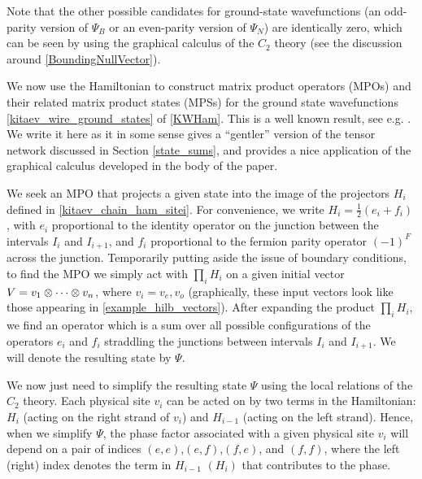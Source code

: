 Note that the other possible candidates for ground-state wavefunctions (an odd-parity version of $\Psi_B$ or an even-parity version of $\Psi_N$) are identically zero, which can be seen by using the graphical 
calculus of the $C_2$ theory (see the discussion around \eqref{BoundingNullVector}).

We now use the Hamiltonian to construct matrix product operators (MPOs) and their related matrix product states (MPSs) for the ground state wavefunctions \eqref{kitaev_wire_ground_states} of \eqref{KWHam}.
This is a well known result, see e.g. \cite{fidkowski2011,turzillo2016,bultinck2017b}.
We write it here as it in some sense gives a ``gentler'' version of the tensor network discussed in Section \ref{state_sums}, and provides a nice application of the graphical calculus developed in the body of the paper.

We seek an MPO that projects a given state into the image of the projectors $H_i$ defined in \eqref{kitaev_chain_ham_sitei}. 
For convenience, we write $H_i =\frac{1}{2}( e_{i} + f_{i})$, with $e_{i}$ proportional to the identity operator on the junction between the intervals $I_i$ and $I_{i+1}$, and $f_{i}$ proportional to the fermion parity operator $(-1)^F$ across the junction.
Temporarily putting aside the issue of boundary conditions, to find the MPO we simply act with $\prod_i H_i$ on 
a given initial vector $V = v_1\otimes \cdots \otimes v_n$, where $v_i=v_e,v_o$ (graphically, these input vectors look like those appearing in \eqref{example_hilb_vectors}).
After expanding the product $\prod_i H_i$, we find an operator which is a sum over all possible configurations of the operators $e_i$ and $f_i$ straddling the junctions between intervals $I_i$ and $I_{i+1}$. 
We will denote the resulting state by $\Psi$.

We now just need to simplify the resulting state $\Psi$ using the local relations of the $C_2$ theory. 
Each physical site $v_i$ can be acted on by two terms in the Hamiltonian: $H_i$ (acting on the right strand of $v_i$) and $H_{i-1}$ (acting on the left strand). 
Hence, when we simplify $\Psi$, the phase factor associated with a given physical site $v_i$ will depend on a pair of indices $(e,e)$,$(e,f)$,$(f,e)$, and $(f,f)$, where 
the left (right) index denotes the term in $H_{i-1}$ $(H_i)$ that contributes to the phase.

